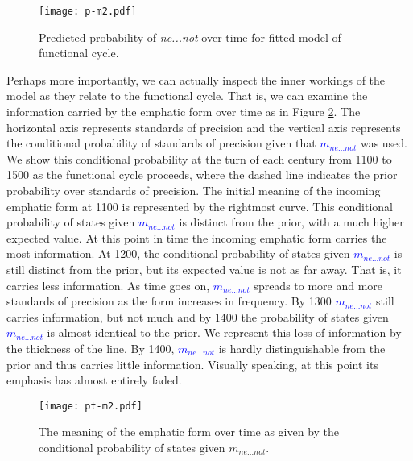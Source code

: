 \documentclass[linguex]{sp}
\theoremstyle{definition} \newtheorem{definition}{Definition}
\begin{document}
\begin{figure}
\centering
     \texttt{[image: p-m2.pdf]}
\caption{Predicted probability of \textit{\color{blue} ne...not} over time for fitted model of functional cycle.}
\label{m2-sol}
\end{figure}

Perhaps more importantly, we can actually inspect the inner workings of the model as they relate to the functional cycle. That is, we can examine the information carried by the emphatic form over time as in Figure \ref{m2-meaning}. The horizontal axis represents standards of precision and the vertical axis represents the conditional probability of standards of precision given that \emph{\textcolor{blue}{$m_{ne...not}$}} was used. We show this conditional probability at the turn of each century from 1100 to 1500 as the functional cycle proceeds, where the dashed line indicates the prior probability over standards of precision.  The initial meaning of the incoming emphatic form at 1100 is represented by the rightmost curve. This conditional probability of states given \emph{\textcolor{blue}{$m_{ne...not}$}} is distinct from the prior, with a much higher expected value. At this point in time the incoming emphatic form carries the most information. At 1200, the conditional probability of states given \emph{\textcolor{blue}{$m_{ne...not}$}} is still distinct from the prior, but its expected value is not as far away. That is, it carries less information. As time goes on, \emph{\textcolor{blue}{$m_{ne...not}$}}  spreads to more and more standards of precision as the form increases in frequency. By 1300 \emph{\textcolor{blue}{$m_{ne...not}$}} still carries information, but not much and by 1400 the probability of states given \emph{\textcolor{blue}{$m_{ne...not}$}} is almost identical to the prior. We represent this loss of information by the thickness of the line. By 1400, \emph{\textcolor{blue}{$m_{ne...not}$}} is hardly distinguishable from the prior and thus carries little information. Visually speaking, at this point its emphasis has almost entirely faded.

\begin{figure}
\centering
     \texttt{[image: pt-m2.pdf]}
\caption{The meaning of the emphatic form over time as given by the conditional probability of states given \textit{\color{blue} $m_{ne...not}$}.}
\label{m2-meaning}
\end{figure}
\end{document}
